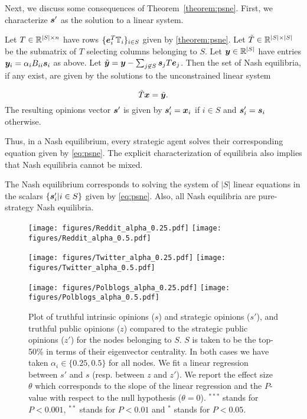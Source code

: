 Next, we discuss some consequences of Theorem~\ref{theorem:psne}. First, we characterize $\bm{s}^\prime$ as the solution to a linear system. 
\begin{cor} \label{cor:psne}
Let $T \in \mathbb{R}^{|S| \times n}$ have rows $\{ \bm{e}_i^T \mathbb T_i \}_{i \in S}$ given by \cref{theorem:psne}. Let $\Tilde T \in \mathbb{R}^{|S| \times |S|}$ be the submatrix of $T$ selecting columns belonging to $S$. Let $\bm{y} \in \mathbb{R}^{|S|}$ have entries $\bm{y}_i = \alpha_i B_{ii} \bm{s}_i$ as above. Let $\Tilde {\bm{y}} = \bm{y} - \sum_{j \not \in S} \bm{s}_j T \bm{e}_j$. Then the set of Nash equilibria, if any exist, are given by the solutions to the unconstrained linear system 

\begin{equation} \label{eq:psne}
    \Tilde T \bm{x} = \Tilde {\bm{y}}.
\end{equation}
The resulting opinions vector $\bm{s}^\prime$ is given by $\bm{s}_i^\prime = \bm{x}_i$ if $i \in S$ and $\bm{s}_i^\prime = \bm{s}_i$ otherwise.
\end{cor}




Thus, in a Nash equilibrium, every strategic agent solves their corresponding equation given by \cref{eq:psne}. The explicit characterization of equilibria also implies that Nash equilibria cannot be mixed. 
\begin{cor}
    The Nash equilibrium corresponds to solving the system of $|S|$ linear equations in the scalars $\{ \bm{s}_i^\prime | i \in S \}$ given by \cref{eq:psne}. Also, all Nash equilibria are pure-strategy Nash equilibria.
\end{cor}


\begin{figure}[t]
    \centering
    \texttt{[image: figures/Reddit\_alpha\_0.25.pdf]} 
    \texttt{[image: figures/Reddit\_alpha\_0.5.pdf]} 

    \texttt{[image: figures/Twitter\_alpha\_0.25.pdf]}
    \texttt{[image: figures/Twitter\_alpha\_0.5.pdf]}

    \texttt{[image: figures/Polblogs\_alpha\_0.25.pdf]} 
    \texttt{[image: figures/Polblogs\_alpha\_0.5.pdf]} 

    \caption{Plot of truthful intrinsic opinions ($s$) and strategic opinions ($s'$), and truthful public opinions ($z$) compared to the strategic public opinions ($z'$) for the nodes belonging to $S$. $S$ is taken to be the top-50\% in terms of their eigenvector centrality. In both cases we have taken $\alpha_i \in \{ 0.25, 0.5 \}$ for all nodes. We fit a linear regression between $s'$ and $s$ (resp. between $z$ and $z'$). We report the effect size $\theta$ which corresponds to the slope of the linear regression and the $P$-value with respect to the null hypothesis ($\theta = 0$). $^{***}$ stands for $P < 0.001$, $^{**}$ stands for $P < 0.01$ and $^{*}$ stands for $P < 0.05$.}
    \label{fig:psne_data}
\end{figure}

